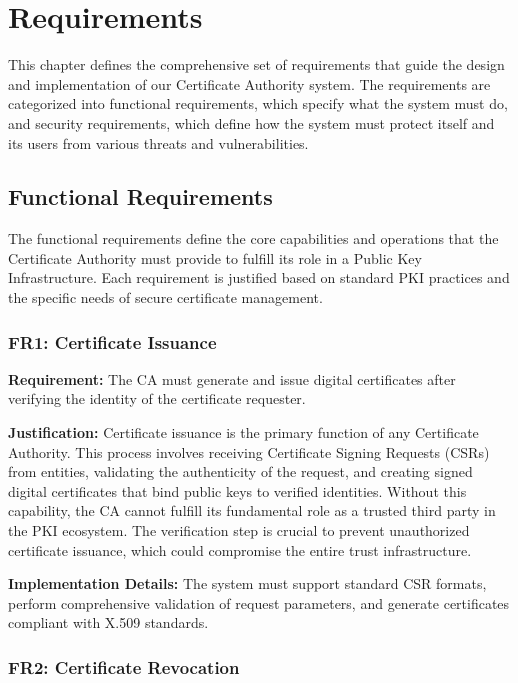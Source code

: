 \chapter{Requirements}

This chapter defines the comprehensive set of requirements that guide the design and implementation of our Certificate Authority system. The requirements are categorized into functional requirements, which specify what the system must do, and security requirements, which define how the system must protect itself and its users from various threats and vulnerabilities.

\section{Functional Requirements}

The functional requirements define the core capabilities and operations that the Certificate Authority must provide to fulfill its role in a Public Key Infrastructure. Each requirement is justified based on standard PKI practices and the specific needs of secure certificate management.

\subsection{FR1: Certificate Issuance}

\textbf{Requirement:} The CA must generate and issue digital certificates after verifying the identity of the certificate requester.

\textbf{Justification:} Certificate issuance is the primary function of any Certificate Authority. This process involves receiving Certificate Signing Requests (CSRs) from entities, validating the authenticity of the request, and creating signed digital certificates that bind public keys to verified identities. Without this capability, the CA cannot fulfill its fundamental role as a trusted third party in the PKI ecosystem. The verification step is crucial to prevent unauthorized certificate issuance, which could compromise the entire trust infrastructure.

\textbf{Implementation Details:} The system must support standard CSR formats, perform comprehensive validation of request parameters, and generate certificates compliant with X.509 standards.

\subsection{FR2: Certificate Revocation}

